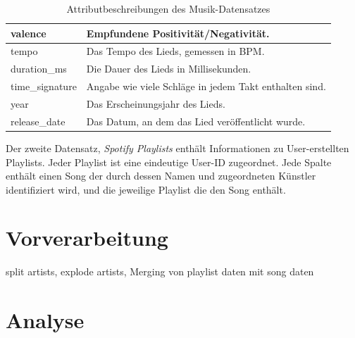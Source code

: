 \documentclass[conference]{IEEEtran}
\begin{document}
\begin{table}[h]
\begin{tabular}{|l|l|}
valence & Empfundene Positivität/Negativität. \\ \hline
tempo & Das Tempo des Lieds, gemessen in BPM. \\ \hline
duration\_ms & Die Dauer des Lieds in Millisekunden. \\ \hline
time\_signature & Angabe wie viele Schläge in jedem Takt enthalten sind. \\ \hline
year & Das Erscheinungsjahr des Lieds. \\ \hline
release\_date & Das Datum, an dem das Lied veröffentlicht wurde. \\ \hline
\end{tabular}
\caption{Attributbeschreibungen des Musik-Datensatzes}
\label{tab:music_dataset}
\end{table}

Der zweite Datensatz, \textit{Spotify Playlists} \cite{d1} enthält Informationen zu User-erstellten Playlists. Jeder Playlist ist eine eindeutige User-ID zugeordnet. Jede Spalte enthält einen Song der durch dessen Namen und zugeordneten Künstler identifiziert wird, und die jeweilige Playlist die den Song enthält. 

\section{Vorverarbeitung}
split artists, explode artists, Merging von playlist daten mit song daten
\section{Analyse}
\end{document}
